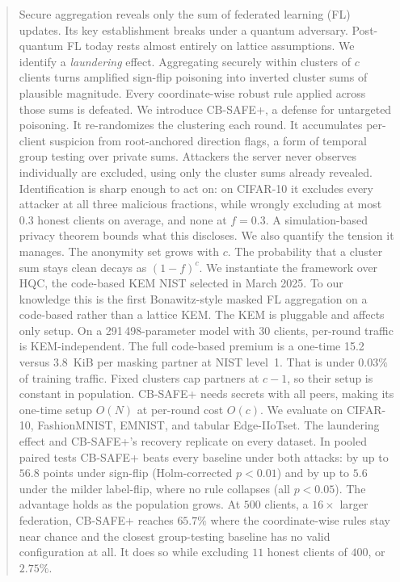 \documentclass[lettersize,journal]{IEEEtran}
\begin{document}
\begin{abstract}
Secure aggregation reveals only the sum of federated learning (FL) updates. Its key
establishment breaks under a quantum adversary. Post-quantum FL today rests almost
entirely on lattice assumptions. We identify a \emph{laundering} effect. Aggregating
securely within clusters of $c$ clients turns amplified sign-flip poisoning into
inverted cluster sums of plausible magnitude. Every coordinate-wise robust rule
applied across those sums is defeated. We introduce CB-SAFE+, a defense for
untargeted poisoning. It re-randomizes the clustering each round. It accumulates
per-client suspicion from root-anchored direction flags, a form of temporal group
testing over private sums. Attackers the server never observes individually are
excluded, using only the cluster sums already revealed. Identification is sharp
enough to act on: on CIFAR-10 it excludes every attacker at all three malicious
fractions, while wrongly excluding at most $0.3$ honest clients on average, and none
at $f{=}0.3$. A simulation-based privacy theorem bounds what this discloses. We also
quantify the tension it manages. The anonymity set grows with $c$. The probability
that a cluster sum stays clean decays as $(1-f)^{c}$.
We instantiate the framework over HQC, the code-based KEM NIST selected in March
2025. To our knowledge this is the first Bonawitz-style masked FL aggregation on a
code-based rather than a lattice KEM. The KEM is pluggable and affects only
setup. On a 291\,498-parameter model with 30 clients, per-round traffic is
KEM-independent. The full code-based premium is a one-time 15.2 versus 3.8~KiB per
masking partner at NIST level~1. That is under $0.03\%$ of training traffic. Fixed
clusters cap partners at $c-1$, so their setup is constant in population. CB-SAFE+
needs secrets with all peers, making its one-time setup $O(N)$ at per-round cost
$O(c)$.
We evaluate on CIFAR-10, FashionMNIST, EMNIST, and tabular Edge-IIoTset. The
laundering effect and CB-SAFE+'s recovery replicate on every dataset. In pooled
paired tests CB-SAFE+ beats every baseline under both attacks: by up to $56.8$ points
under sign-flip (Holm-corrected $p{<}0.01$) and by up to $5.6$ under the milder
label-flip, where no rule collapses (all $p{<}0.05$). The advantage holds as the
population grows. At $500$ clients, a $16\times$ larger
federation, CB-SAFE+ reaches $65.7\%$ where the coordinate-wise rules stay near
chance and the closest group-testing baseline has no valid configuration at all. It
does so while excluding $11$ honest clients of $400$, or $2.75\%$.
\end{abstract}
\end{document}
